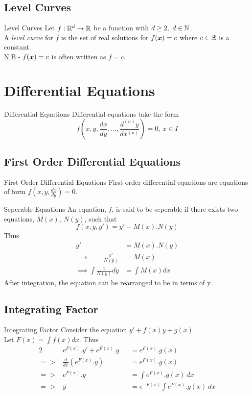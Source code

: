 \documentclass[11pt,a4paper]{article}
\begin{document}
\subsection{Level Curves}
%
\subtitle{Definition 5.05 - }{Level Curves}
Let $f : \mathbb{R}^d \to \mathbb{R}$ be a function with $d \geq 2,\ d \in \mathbb{N}$.\\
A \textit{level curve} for $f$ is the set of real solutions for $f(\boldsymbol{x}) = c$ where $c \in \mathbb{R}$ is a constant.\\
\underline{N.B} - $f(\boldsymbol{x}) = c$ is often written as $f = c$.

\section{Differential Equations}
%
\subtitle{Definition 6.01 - }{Differential Equations}
Differential equations take the form
$$f(x, y, \frac{dx}{dy}, ... , \frac{d^{(n)}y}{dx^{(n)}}) = 0,\ x \in I$$

\subsection{First Order Differential Equations}
%
\subtitle{Definition 6.02 - }{First Order Differential Equations}
First order differential equations are equations of form $f(x, y, \frac{dx}{dy}) = 0$. \\

\subtitle{Definition 6.03 - }{Seperable Equations}
An equation, $f$, is said to be seperable if there exists two equations, $M(x),\ N(y)$, such that $$f(x, y, y') = y' - M(x).N(y)$$
Thus \begin{align*}
  y'\ \ \ &= M(x).N(y) \\
  \implies \quad \quad \frac{y'}{N(y)} &= M(x) \\
  \implies \int{\frac{1}{N(y)}dy} &= \int{M(x)dx}
\end{align*}
After integration, the equation can be rearranged to be in terms of y.

\subsection{Integrating Factor}

\subtitle{Theorem 6.04 - }{Integrating Factor}
Consider the equation $y' + f(x)y + g(x)$.\\
Let $F(x) = \int{f(x)dx}$. Thus \begin{alignat*}{2}
  &e^{F(x)}.y' + e^{F(x)}.y &&= e^{F(x)}.g(x) \\
  => &\frac{d}{dx}\left(e^{F(x)}.y \right) &&= e^{F(x)}.g(x) \\
  => &e^{F(x)}.y &&= \int{e^{F(x)}.g(x)\ dx} \\
  => &y &&= e^{-F(x)} \int{e^{F(x)}.g(x)\ dx}
\end{alignat*}
\end{document}
